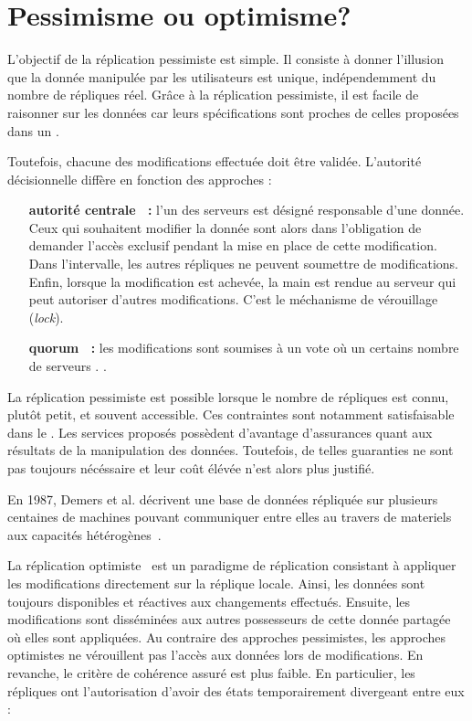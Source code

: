 
\section{Pessimisme ou optimisme?}
\label{repl:sec:schemas}

L'objectif de la réplication pessimiste est simple. Il consiste à donner
l'illusion que la donnée manipulée par les utilisateurs est unique,
indépendemment du nombre de répliques réel. Grâce à la réplication pessimiste,
il est facile de raisonner sur les données car leurs spécifications sont proches
de celles proposées dans un .

Toutefois, chacune des modifications effectuée doit être validée. L'autorité
décisionnelle diffère en fonction des approches :
\begin{itemize}
\item [\textbf{autorité centrale~\cite{alsberg1976principle} :}] l'un des
  serveurs est désigné responsable d'une donnée. Ceux qui souhaitent modifier la
  donnée sont alors dans l'obligation de demander l'accès exclusif pendant la
  mise en place de cette modification. Dans l'intervalle, les autres répliques
  ne peuvent soumettre de modifications. Enfin, lorsque la modification est
  achevée, la main est rendue au serveur qui peut autoriser d'autres
  modifications. C'est le méchanisme de vérouillage (\emph{lock}).
\item [\textbf{quorum~\cite{gifford1979weighted} :}] les modifications sont
  soumises à un vote où un certains nombre de serveurs . .
\end{itemize}

La réplication pessimiste est possible lorsque le nombre de répliques est connu,
plutôt petit, et souvent accessible. Ces contraintes sont notamment
satisfaisable dans le . Les services proposés possèdent d'avantage
d'assurances quant aux résultats de la manipulation des données. Toutefois, de
telles guaranties ne sont pas toujours nécéssaire et leur coût élévée n'est
alors plus justifié. 


En 1987, Demers et al. décrivent une base de données répliquée sur plusieurs
centaines de machines pouvant communiquer entre elles au travers de materiels
aux capacités hétérogènes~\cite{demers1987epidemic}. 

La réplication optimiste~\cite{johnson1975maintenance, saito2005optimistic} est
un paradigme de réplication consistant à appliquer les modifications directement
sur la réplique locale.  Ainsi, les données sont toujours disponibles et
réactives aux changements effectués. Ensuite, les modifications sont disséminées
aux autres possesseurs de cette donnée partagée où elles sont appliquées. Au
contraire des approches pessimistes, les approches optimistes ne vérouillent pas
l'accès aux données lors de modifications. En revanche, le critère de cohérence
assuré est plus faible. En particulier, les répliques ont l'autorisation d'avoir
des états temporairement divergeant entre eux :

